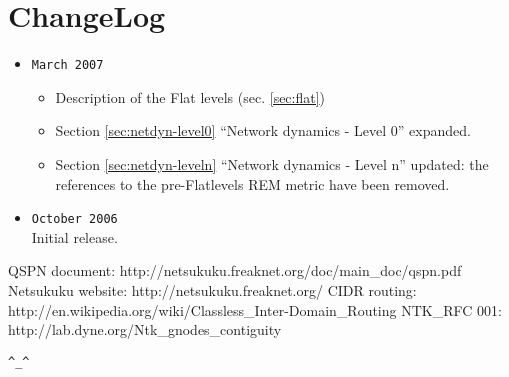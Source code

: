 \documentclass[a4paper]{article}
\newcommand{\href}[2]{ #1 }
\begin{document}
\section{ChangeLog}
\begin{itemize}
	\item \verb|March 2007|
		\begin{itemize}
			\item Description of the Flat levels (sec. \ref{sec:flat})
			\item Section \ref{sec:netdyn-level0} ``Network dynamics - Level 0'' expanded.
			\item Section \ref{sec:netdyn-leveln} ``Network
				dynamics - Level n'' updated: the references to
				the pre-Flatlevels REM metric have been
				removed.
		\end{itemize}
	\item \verb|October 2006|\\
		Initial release.
\end{itemize}
\begin{thebibliography}{99}
	 QSPN document:
		\href{http://netsukuku.freaknet.org/doc/main\_doc/qspn.pdf}{qspn.pdf}
	 Netsukuku website:
		\href{http://netsukuku.freaknet.org/}{http://netsukuku.freaknet.org/}
	 CIDR routing:
		\href{http://en.wikipedia.org/wiki/Classless\_Inter-Domain\_Routing}{Classless\_Inter-Domain\_Routing in Wikipedia}
	 NTK\_RFC 001:
		\href{http://lab.dyne.org/Ntk\_gnodes\_contiguity}{Gnode contiguity}
\end{thebibliography}
\newpage

\begin{center}
\verb|^_^|
\end{center}
\end{document}
